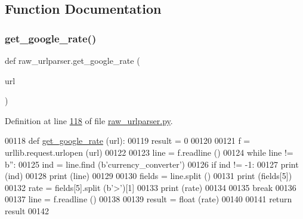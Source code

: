 \subsection{Function Documentation}
\mbox{\label{namespaceraw__urlparser_a4faaced9140d84b3f953c21eb1c4a19d}} 
\subsubsection{\texorpdfstring{get\+\_\+google\+\_\+rate()}{get\_google\_rate()}}
{\footnotesize\ttfamily def raw\+\_\+urlparser.\+get\+\_\+google\+\_\+rate (\begin{DoxyParamCaption}\item[{}]{url }\end{DoxyParamCaption})}



Definition at line \hyperlink{raw__urlparser_8py_source_l00118}{118} of file \hyperlink{raw__urlparser_8py_source}{raw\+\_\+urlparser.\+py}.


\begin{DoxyCode}
00118 \textcolor{keyword}{def }\hyperlink{namespaceraw__urlparser_a4faaced9140d84b3f953c21eb1c4a19d}{get\_google\_rate} (url):
00119     result = 0
00120 
00121     f = urllib.request.urlopen (url)
00122     
00123     line = f.readline ()
00124     \textcolor{keywordflow}{while} line != b\textcolor{stringliteral}{''}:
00125         ind = line.find (b\textcolor{stringliteral}{'currency\_converter'})
00126         \textcolor{keywordflow}{if} ind != -1:
00127             \textcolor{keywordflow}{print} (ind)
00128             \textcolor{keywordflow}{print} (line)
00129             
00130             fields = line.split ()
00131             \textcolor{keywordflow}{print} (fields[5])
00132             rate = fields[5].split (b\textcolor{stringliteral}{'>'})[1]
00133             \textcolor{keywordflow}{print} (rate)
00134             
00135             \textcolor{keywordflow}{break}
00136             
00137         line = f.readline ()
00138     
00139     result = float (rate)
00140     
00141     \textcolor{keywordflow}{return} result
00142     
\end{DoxyCode}
\mbox{\label{namespaceraw__urlparser_aa5905f1b040de4865980526ac3c6a16c}} 
